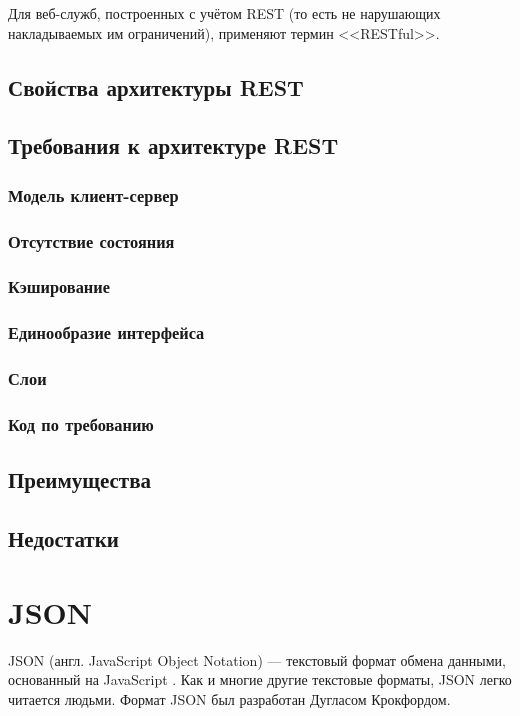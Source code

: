 \documentclass[a4page]{article}
\begin{document}
Для веб-служб, построенных с учётом REST (то есть не нарушающих накладываемых им ограничений),
применяют термин <<RESTful>>.

\subsection{Свойства архитектуры REST}

\subsection{Требования к архитектуре REST}
\subsubsection{Модель клиент-сервер}
\subsubsection{Отсутствие состояния}
\subsubsection{Кэширование}
\subsubsection{Единообразие интерфейса}
\subsubsection{Слои}
\subsubsection{Код по требованию}

\subsection{Преимущества}

\subsection{Недостатки}

\newpage
\section{JSON}
JSON (англ. JavaScript Object Notation) ---
текстовый формат обмена данными, основанный на JavaScript \cite{rfc8259}\cite{ISO21778}.
Как и многие другие текстовые форматы, JSON легко читается людьми.
Формат JSON был разработан Дугласом Крокфордом.
\end{document}
